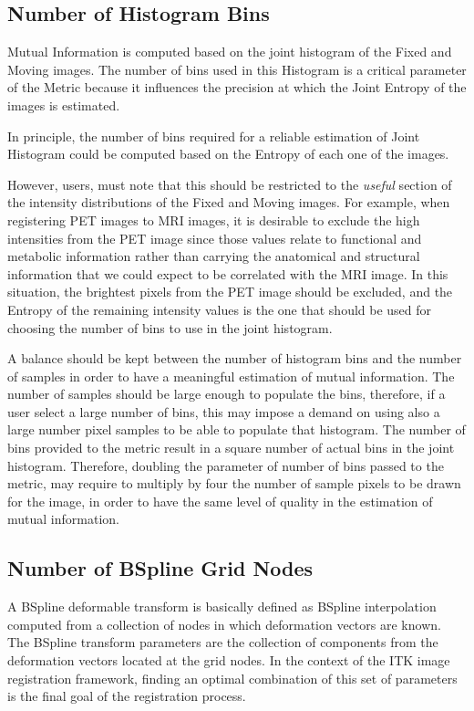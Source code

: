 \documentclass{InsightArticle}
\begin{document}
\subsection{Number of Histogram Bins}

Mutual Information is computed based on the joint histogram of the Fixed and
Moving images. The number of bins used in this Histogram is a critical
parameter of the Metric because it influences the precision at which the Joint
Entropy of the images is estimated.

In principle, the number of bins required for a reliable estimation of Joint 
Histogram could be computed based on the Entropy of each one of the images.

However, users, must note that this should be restricted to the \emph{useful}
section of the intensity distributions of the Fixed and Moving images. For
example, when registering PET images to MRI images, it is desirable to exclude
the high intensities from the PET image since those values relate to functional
and metabolic information rather than carrying the anatomical and structural
information that we could expect to be correlated with the MRI image. In this
situation, the brightest pixels from the PET image should be excluded, and the
Entropy of the remaining intensity values is the one that should be used for
choosing the number of bins to use in the joint histogram.

A balance should be kept between the number of histogram bins and the number of
samples in order to have a meaningful estimation of mutual information. The
number of samples should be large enough to populate the bins, therefore, if a
user select a large number of bins, this may impose a demand on using also a
large number pixel samples to be able to populate that histogram. The number of
bins provided to the metric result in a square number of actual bins in the joint
histogram. Therefore, doubling the parameter of number of bins passed to the
metric, may require to multiply by four the number of sample pixels to be drawn
for the image, in order to have the same level of quality in the estimation of
mutual information.


\subsection{Number of BSpline Grid Nodes}

A BSpline deformable transform is basically defined as BSpline interpolation
computed from a collection of nodes in which deformation vectors are known.
The BSpline transform parameters are the collection of components from the
deformation vectors located at the grid nodes. In the context of the ITK image
registration framework, finding an optimal combination of this set of
parameters is the final goal of the registration process.
\end{document}
